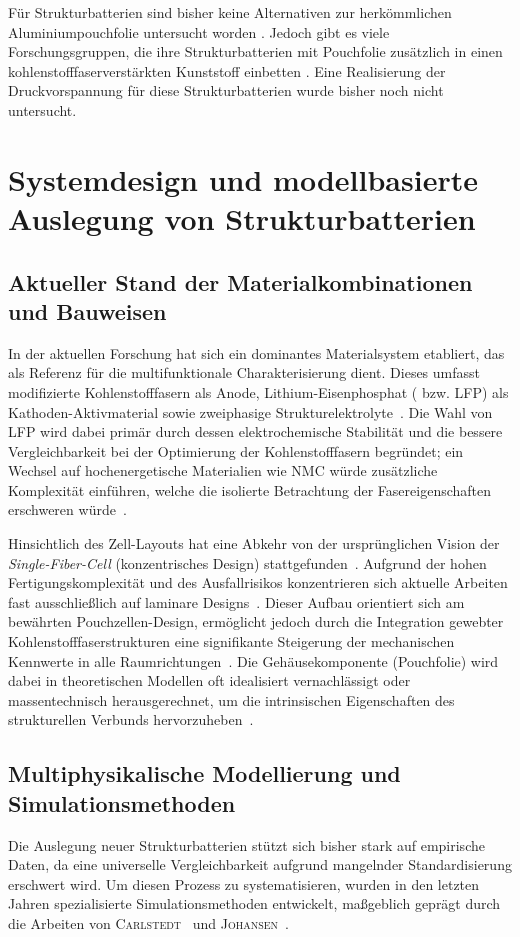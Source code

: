 Für Strukturbatterien sind bisher keine Alternativen zur herkömmlichen Aluminiumpouchfolie untersucht worden \cite{Ye2024}. Jedoch gibt es viele Forschungsgruppen, die ihre Strukturbatterien mit Pouchfolie zusätzlich in einen kohlenstofffaserverstärkten Kunststoff einbetten \cite{Pattarakunnan2020,Asp2021}. Eine Realisierung der Druckvorspannung für diese Strukturbatterien wurde bisher noch nicht untersucht.

\section{Systemdesign und modellbasierte Auslegung von Strukturbatterien}

\subsection{Aktueller Stand der Materialkombinationen und Bauweisen}
In der aktuellen Forschung hat sich ein dominantes Materialsystem etabliert, das als Referenz für die multifunktionale Charakterisierung dient. Dieses umfasst modifizierte Kohlenstofffasern als Anode, Lithium-Eisenphosphat ( bzw. LFP) als Kathoden-Aktivmaterial sowie zweiphasige Strukturelektrolyte~\cite{Asp2021, Asp2024, Chaudhary2024}. Die Wahl von LFP wird dabei primär durch dessen elektrochemische Stabilität und die bessere Vergleichbarkeit bei der Optimierung der Kohlenstofffasern begründet; ein Wechsel auf hochenergetische Materialien wie NMC würde zusätzliche Komplexität einführen, welche die isolierte Betrachtung der Fasereigenschaften erschweren würde~\cite{Asp2024}.

Hinsichtlich des Zell-Layouts hat eine Abkehr von der ursprünglichen Vision der \textit{Single-Fiber-Cell} (konzentrisches Design) stattgefunden~\cite{Ekstedt2010, Leijonmarck2013}. Aufgrund der hohen Fertigungskomplexität und des Ausfallrisikos konzentrieren sich aktuelle Arbeiten fast ausschließlich auf laminare Designs~\cite{Johannisson2018, Xu2022}. Dieser Aufbau orientiert sich am bewährten Pouchzellen-Design, ermöglicht jedoch durch die Integration gewebter Kohlenstofffaserstrukturen eine signifikante Steigerung der mechanischen Kennwerte in alle Raumrichtungen~\cite{Xu2022}. Die Gehäusekomponente (Pouchfolie) wird dabei in theoretischen Modellen oft idealisiert vernachlässigt oder massentechnisch herausgerechnet, um die intrinsischen Eigenschaften des strukturellen Verbunds hervorzuheben~\cite{Danzi2021, Ye2024}.

\subsection{\label{sec:soa_simulation}Multiphysikalische Modellierung und Simulationsmethoden}
Die Auslegung neuer Strukturbatterien stützt sich bisher stark auf empirische Daten, da eine universelle Vergleichbarkeit aufgrund mangelnder Standardisierung erschwert wird. Um diesen Prozess zu systematisieren, wurden in den letzten Jahren spezialisierte Simulationsmethoden entwickelt, maßgeblich geprägt durch die Arbeiten von \textsc{Carlstedt}~\cite{Carlstedt2022, Carlstedt2022a} und \textsc{Johansen}~\cite{Larsson2023, Johansen2024}. 

